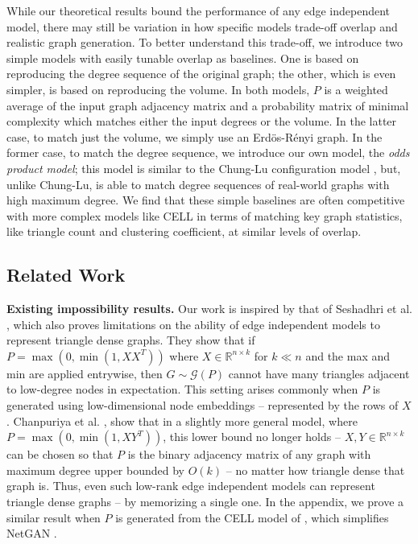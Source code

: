 \documentclass{article}
\newcommand{\todo}[1]{\textcolor{blue}{TODO: #1}}
\newcommand{\Cam}[1]{\textcolor{blue}{Cam: #1}}
\newcommand{\R}{\mathbb{R}}
\begin{document}
 While our theoretical results bound the performance of any  edge independent model, there may still be variation in how specific models trade-off overlap and realistic graph generation. 
 To better understand this trade-off, we introduce two simple models with easily tunable overlap as baselines. One is based on reproducing the degree sequence of the original graph; the other, which is even simpler, is based on reproducing the volume.
 In both  models, $P$ is a  weighted average of the input graph adjacency matrix and a probability matrix of minimal complexity which matches either the input degrees or the volume. In the latter case, to match just the volume, we simply use an Erd\"{o}s-R\'{e}nyi graph. In the former case, to match the degree sequence, we introduce our own model, the \emph{odds product model}; this model is similar to the Chung-Lu configuration model \cite{ChungLu:2002}, but, unlike Chung-Lu, is able to match degree sequences of real-world graphs with high maximum degree.
We find that these simple baselines are often competitive with more complex models like CELL in terms of matching key graph statistics, like triangle count and clustering coefficient, at similar levels of overlap. %


\subsection{Related Work}\label{sec:rel}

\noindent\textbf{Existing impossibility results.} Our work is inspired by that of Seshadhri et al. \cite{SeshadhriSharmaStolman:2020}, which also proves limitations on the ability of edge independent models to represent triangle dense graphs. They show that if $P = \max(0,\min(1,XX^T))$ where $X \in \R^{n \times k}$ for $k \ll n$ and the max and min are applied entrywise, then $G \sim \mathcal{G}(P)$ cannot have many triangles adjacent to low-degree nodes in expectation. This setting arises commonly when $P$ is generated using low-dimensional node embeddings -- represented by the rows of $X$. Chanpuriya et al. \cite{ChanpuriyaMuscoSotiropoulos:2020}, show that in a slightly more general model, where $P = \max(0,\min(1,XY^T))$, this lower bound no longer holds -- $X,Y \in \R^{n \times k}$ can be chosen so that $P$ is the binary adjacency matrix of any graph with maximum degree upper bounded by $O(k)$ -- no matter how triangle dense that graph is. Thus, even such low-rank edge independent models can represent triangle dense graphs -- by memorizing a single one. In the appendix, we prove a similar result when $P$ is generated from the CELL model of \cite{rendsburgnetgan}, which simplifies NetGAN \cite{bojchevski2018netgan}.
\end{document}
